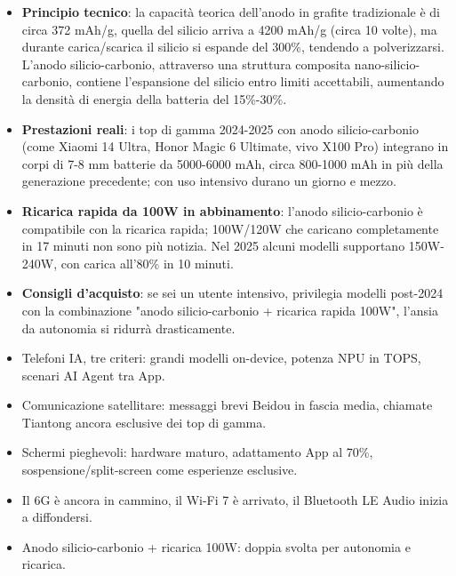 \begin{itemize}
  \item \textbf{Principio tecnico}: la capacità teorica dell'anodo in grafite tradizionale è di circa 372 mAh/g, quella del silicio arriva a 4200 mAh/g (circa 10 volte), ma durante carica/scarica il silicio si espande del 300\%, tendendo a polverizzarsi. L'anodo silicio-carbonio, attraverso una struttura composita nano-silicio-carbonio, contiene l'espansione del silicio entro limiti accettabili, aumentando la densità di energia della batteria del 15\%-30\%.
  \item \textbf{Prestazioni reali}: i top di gamma 2024-2025 con anodo silicio-carbonio (come Xiaomi 14 Ultra, Honor Magic 6 Ultimate, vivo X100 Pro) integrano in corpi di 7-8 mm batterie da 5000-6000 mAh, circa 800-1000 mAh in più della generazione precedente; con uso intensivo durano un giorno e mezzo.
  \item \textbf{Ricarica rapida da 100W in abbinamento}: l'anodo silicio-carbonio è compatibile con la ricarica rapida; 100W/120W che caricano completamente in 17 minuti non sono più notizia. Nel 2025 alcuni modelli supportano 150W-240W, con carica all'80\% in 10 minuti.
  \item \textbf{Consigli d'acquisto}: se sei un utente intensivo, privilegia modelli post-2024 con la combinazione "anodo silicio-carbonio + ricarica rapida 100W", l'ansia da autonomia si ridurrà drasticamente.
\end{itemize}


\begin{itemize}
  \item Telefoni IA, tre criteri: grandi modelli on-device, potenza NPU in TOPS, scenari AI Agent tra App.
  \item Comunicazione satellitare: messaggi brevi Beidou in fascia media, chiamate Tiantong ancora esclusive dei top di gamma.
  \item Schermi pieghevoli: hardware maturo, adattamento App al 70\%, sospensione/split-screen come esperienze esclusive.
  \item Il 6G è ancora in cammino, il Wi-Fi 7 è arrivato, il Bluetooth LE Audio inizia a diffondersi.
  \item Anodo silicio-carbonio + ricarica 100W: doppia svolta per autonomia e ricarica.
\end{itemize}

